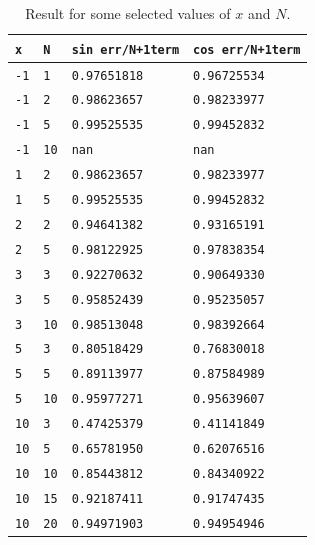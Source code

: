 \documentclass[a4paper,10pt]{article}
\begin{document}
\begin{table}[!ht]
\centering 
  \begin{minipage}[t]{105mm}
    \caption{
      Result for some selected values of $x$ and $N$.
    } 
    \label{TABtask12}
  \end{minipage}

  \vspace{5mm}
  \begin{tabular}{l l l l} 
    \texttt{x}&\texttt{N}&\texttt{sin err/N+1term} & \texttt{cos err/N+1term} \\
    \hline
    \texttt{-1}	& \texttt{1}	& \texttt{0.97651818} & \texttt{0.96725534} 	\\
    \texttt{-1}	& \texttt{2}	& \texttt{0.98623657} & \texttt{0.98233977} 	\\
    \texttt{-1}	& \texttt{5}	& \texttt{0.99525535} & \texttt{0.99452832} 	\\
    \texttt{-1}	& \texttt{10}	& \texttt{nan} & \texttt{nan} 	\\
    \hline 
    \texttt{1}	& \texttt{2}	& \texttt{0.98623657} & \texttt{0.98233977} 	\\
    \texttt{1}	& \texttt{5}	& \texttt{0.99525535} & \texttt{0.99452832} 	\\
    \hline
    \texttt{2}	& \texttt{2} 	& \texttt{0.94641382} & \texttt{0.93165191}	\\
    \texttt{2}	& \texttt{5}	& \texttt{0.98122925} & \texttt{0.97838354}	\\
    \hline
    \texttt{3}	& \texttt{3}	& \texttt{0.92270632} & \texttt{0.90649330}	\\
    \texttt{3}	& \texttt{5}	& \texttt{0.95852439} & \texttt{0.95235057}	\\
    \texttt{3}	& \texttt{10}	& \texttt{0.98513048} & \texttt{0.98392664}	\\
    \hline
    \texttt{5}	& \texttt{3}	& \texttt{0.80518429} & \texttt{0.76830018}	\\
    \texttt{5}	& \texttt{5}	& \texttt{0.89113977} & \texttt{0.87584989}	\\
    \texttt{5}	& \texttt{10}	& \texttt{0.95977271} & \texttt{0.95639607}	\\
    \hline
    \texttt{10}	& \texttt{3}	& \texttt{0.47425379} & \texttt{0.41141849}	\\
    \texttt{10}	& \texttt{5}	& \texttt{0.65781950} & \texttt{0.62076516}	\\
    \texttt{10}	& \texttt{10}	& \texttt{0.85443812} & \texttt{0.84340922}	\\
    \texttt{10}	& \texttt{15}	& \texttt{0.92187411} & \texttt{0.91747435}	\\
    \texttt{10}	& \texttt{20}	& \texttt{0.94971903} & \texttt{0.94954946}	\\
  \end{tabular}
\end{table}
\end{document}
